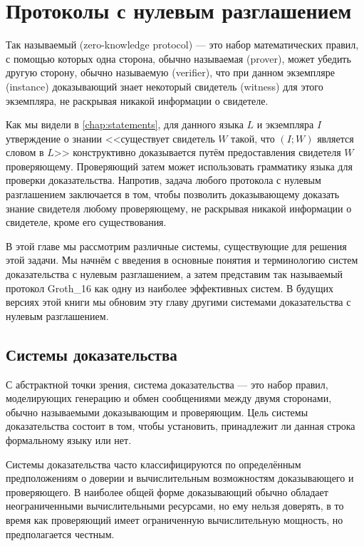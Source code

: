 \chapter{Протоколы с нулевым разглашением}
\label{chapter:zk-protocols}
Так называемый  (zero-knowledge protocol) --- это набор математических правил, с помощью которых одна сторона, обычно называемая  (prover), может убедить другую сторону, обычно называемую  (verifier), что при данном экземпляре (instance) доказывающий знает некоторый свидетель (witness) для этого экземпляра, не раскрывая никакой информации о свидетеле.

Как мы видели в \chaptname{} \ref{chap:statements}, для данного языка $L$ и экземпляра $I$ утверждение о знании <<существует свидетель $W$ такой, что $(I;W)$ является словом в $L$>> конструктивно доказывается путём предоставления свидетеля $W$ проверяющему. Проверяющий затем может использовать грамматику языка для проверки доказательства. Напротив, задача любого протокола с нулевым разглашением заключается в том, чтобы позволить доказывающему доказать знание свидетеля любому проверяющему, не раскрывая никакой информации о свидетеле, кроме его существования.

В этой главе мы рассмотрим различные системы, существующие для решения этой задачи. Мы начнём с введения в основные понятия и терминологию систем доказательства с нулевым разглашением, а затем представим так называемый протокол Groth\_16 как одну из наиболее эффективных систем. В будущих версиях этой книги мы обновим эту главу другими системами доказательства с нулевым разглашением.

\section{Системы доказательства}
С абстрактной точки зрения, система доказательства --- это набор правил, моделирующих генерацию и обмен сообщениями между двумя сторонами, обычно называемыми доказывающим и проверяющим. Цель системы доказательства состоит в том, чтобы установить, принадлежит ли данная строка формальному языку или нет.

Системы доказательства часто классифицируются по определённым предположениям о доверии и вычислительным возможностям доказывающего и проверяющего. В наиболее общей форме доказывающий обычно обладает неограниченными вычислительными ресурсами, но ему нельзя доверять, в то время как проверяющий имеет ограниченную вычислительную мощность, но предполагается честным.

